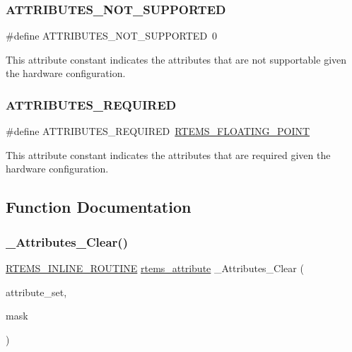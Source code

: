 \subsubsection{\texorpdfstring{ATTRIBUTES\_NOT\_SUPPORTED}{ATTRIBUTES\_NOT\_SUPPORTED}}
{\footnotesize\ttfamily \#define A\+T\+T\+R\+I\+B\+U\+T\+E\+S\+\_\+\+N\+O\+T\+\_\+\+S\+U\+P\+P\+O\+R\+T\+ED~0}

This attribute constant indicates the attributes that are not supportable given the hardware configuration. \mbox{\label{group__ClassicAttributesImpl_gaa314041c9f54f35f4da62deb3475deb9}} 
\subsubsection{\texorpdfstring{ATTRIBUTES\_REQUIRED}{ATTRIBUTES\_REQUIRED}}
{\footnotesize\ttfamily \#define A\+T\+T\+R\+I\+B\+U\+T\+E\+S\+\_\+\+R\+E\+Q\+U\+I\+R\+ED~\mbox{\hyperlink{group__ClassicAttributes_gac0368fd84c0d3e0f969d72afc5126881}{R\+T\+E\+M\+S\+\_\+\+F\+L\+O\+A\+T\+I\+N\+G\+\_\+\+P\+O\+I\+NT}}}

This attribute constant indicates the attributes that are required given the hardware configuration. 

\subsection{Function Documentation}
\mbox{\label{group__ClassicAttributesImpl_gae96795baaff6c74b42a9dafd286b93f7}} 
\subsubsection{\texorpdfstring{\_Attributes\_Clear()}{\_Attributes\_Clear()}}
{\footnotesize\ttfamily \mbox{\hyperlink{group__RTEMSScoreBaseDefs_gac216239df231d5dbd15e3520b0b9313f}{R\+T\+E\+M\+S\+\_\+\+I\+N\+L\+I\+N\+E\+\_\+\+R\+O\+U\+T\+I\+NE}} \mbox{\hyperlink{group__ClassicAttributes_gaea40313cf78ed843e09c4315d0a10f79}{rtems\+\_\+attribute}} \+\_\+\+Attributes\+\_\+\+Clear (\begin{DoxyParamCaption}\item[{\mbox{\hyperlink{group__ClassicAttributes_gaea40313cf78ed843e09c4315d0a10f79}{rtems\+\_\+attribute}}}]{attribute\+\_\+set,  }\item[{\mbox{\hyperlink{group__ClassicAttributes_gaea40313cf78ed843e09c4315d0a10f79}{rtems\+\_\+attribute}}}]{mask }\end{DoxyParamCaption})}



